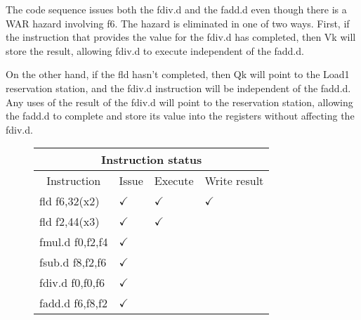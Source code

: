 \begin{enumerate}
    The code sequence issues both the fdiv.d and the fadd.d even though there is a WAR hazard involving f6. The hazard is eliminated in one of two ways. First, if the instruction that provides the value for the fdiv.d has completed, then Vk will store the result, allowing fdiv.d to execute independent of the fadd.d.

    On the other hand, if the fld hasn't completed, then Qk will point to the Load1 reservation station, and the fdiv.d instruction will be independent of the fadd.d. Any uses of the result of the fdiv.d will point to the reservation station, allowing the fadd.d to complete and store its value into the registers without affecting the fdiv.d.

    \begin{figure}[ht]
        \centering
        \begin{tabular}{|l|l|l|l|l|l|l|l|}
            \hline
            \multicolumn{8}{|c|}{Instruction status} \\
            \hline
            \multicolumn{2}{|c|}{Instruction} & \multicolumn{2}{c|}{Issue} & \multicolumn{2}{c|}{Execute} & \multicolumn{2}{c|}{Write result} \\
            \hline
            \multicolumn{2}{|l|}{fld f6,32(x2)} & \multicolumn{2}{l|}{$\checkmark$} & \multicolumn{2}{l|}{$\checkmark$} & \multicolumn{2}{l|}{$\checkmark$} \\
            \hline
            \multicolumn{2}{|l|}{fld f2,44(x3)} & \multicolumn{2}{l|}{$\checkmark$} & \multicolumn{2}{l|}{$\checkmark$} & \multicolumn{2}{l|}{} \\
            \hline
            \multicolumn{2}{|l|}{fmul.d f0,f2,f4} & \multicolumn{2}{l|}{$\checkmark$} & \multicolumn{2}{l|}{} & \multicolumn{2}{l|}{} \\
            \hline
            \multicolumn{2}{|l|}{fsub.d f8,f2,f6} & \multicolumn{2}{l|}{$\checkmark$} & \multicolumn{2}{l|}{} & \multicolumn{2}{l|}{} \\
            \hline
            \multicolumn{2}{|l|}{fdiv.d f0,f0,f6} & \multicolumn{2}{l|}{$\checkmark$} & \multicolumn{2}{l|}{} & \multicolumn{2}{l|}{} \\
            \hline
            \multicolumn{2}{|l|}{fadd.d f6,f8,f2} & \multicolumn{2}{l|}{$\checkmark$} & \multicolumn{2}{l|}{} & \multicolumn{2}{l|}{} \\
            \hline
        \end{tabular}
        
        \vspace{0.5cm}
        

\end{figure}
\end{enumerate}
